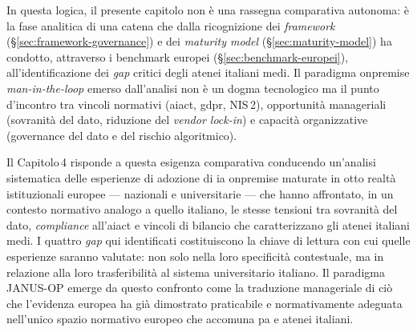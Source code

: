 In questa logica, il presente capitolo non è una rassegna comparativa autonoma: è la
fase analitica di una catena che dalla ricognizione dei \textit{framework}
(\S\ref{sec:framework-governance}) e dei \textit{maturity model}
(\S\ref{sec:maturity-model}) ha condotto, attraverso i benchmark europei
(\S\ref{sec:benchmark-europei}), all'identificazione dei \textit{gap} critici degli
atenei italiani medi. Il paradigma \gls{onpremise} \textit{man-in-the-loop} emerso
dall'analisi non è un dogma tecnologico ma il punto d'incontro tra vincoli normativi
(\gls{aiact}, \gls{gdpr}, NIS\,2), opportunità manageriali (sovranità del dato, riduzione del
\textit{vendor lock-in}) e capacità organizzative (governance del dato e del rischio
algoritmico).

Il Capitolo\,4 risponde a questa esigenza comparativa conducendo un'analisi sistematica
delle esperienze di adozione di \gls{ia} \gls{onpremise} maturate in otto realtà istituzionali
europee --- nazionali e universitarie --- che hanno affrontato, in un contesto normativo
analogo a quello italiano, le stesse tensioni tra sovranità del dato, \textit{compliance}
all'\gls{aiact} e vincoli di bilancio che caratterizzano gli atenei italiani medi. I quattro
\textit{gap} qui identificati costituiscono la chiave di lettura con cui quelle esperienze
saranno valutate: non solo nella loro specificità contestuale, ma in relazione alla loro
trasferibilità al sistema universitario italiano. Il paradigma JANUS-OP emerge da questo
confronto come la traduzione manageriale di ciò che l'evidenza europea ha già dimostrato praticabile e normativamente adeguata nell'unico spazio normativo europeo che accomuna \gls{pa} e atenei italiani.
